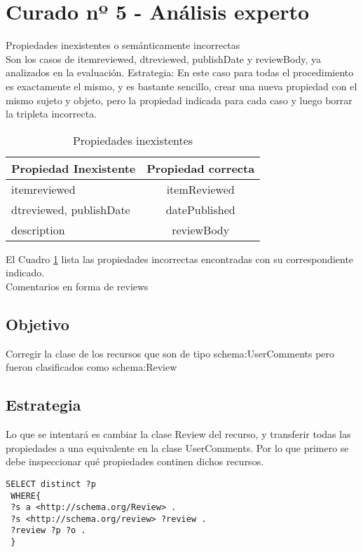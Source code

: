 \section{Curado nº 5 - Análisis experto}
\label{section:curado-analisis}
Propiedades inexistentes o semánticamente incorrectas\\
Son los casos de itemreviewed, dtreviewed, publishDate y reviewBody, ya analizados en la evaluación.
Estrategia: En este caso para todas el procedimiento es exactamente el mismo, y es bastante sencillo, crear una nueva propiedad con 
el mismo sujeto y objeto, pero la propiedad indicada para cada caso y luego borrar la tripleta incorrecta.\\

\begin{table}[h]
\begin{tabular}{| l | c |}\hline
 Propiedad Inexistente & Propiedad correcta \\\hline
 itemreviewed & itemReviewed\\
 dtreviewed, publishDate & datePublished\\
 description & reviewBody\\\hline
\end{tabular}
\caption{Propiedades inexistentes}
\label{table:UndefinedProps}
\end{table}

El Cuadro \ref{table:UndefinedProps} lista las propiedades incorrectas encontradas con su correspondiente indicado.
\\
Comentarios en forma de reviews\\
\subsection*{Objetivo}
Corregir la clase de los recursos que son de tipo schema:UserComments pero fueron clasificados como schema:Review

\subsection*{Estrategia}
Lo que se intentará es cambiar la clase Review del recurso, y transferir todas las propiedades a una equivalente en la clase UserComments.
Por lo que primero se debe inspeccionar qué propiedades continen dichos recursos.

\begin{lstlisting}[frame=single]
 SELECT distinct ?p
 WHERE{
 ?s a <http://schema.org/Review> .
 ?s <http://schema.org/review> ?review .
 ?review ?p ?o .
 }
\end{lstlisting}

